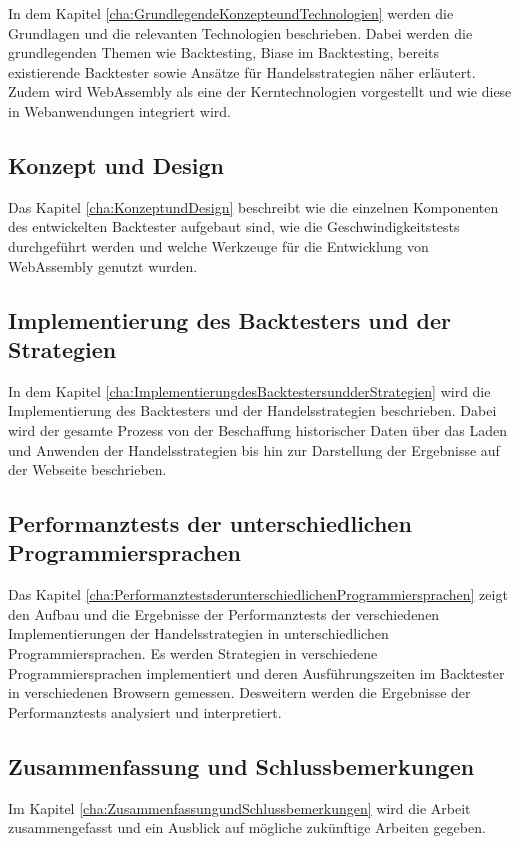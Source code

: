 In dem Kapitel \ref{cha:GrundlegendeKonzepteundTechnologien} werden die Grundlagen und die relevanten Technologien beschrieben.
Dabei werden die grundlegenden Themen wie Backtesting, Biase im Backtesting, bereits existierende Backtester sowie Ansätze für Handelsstrategien näher erläutert.
Zudem wird WebAssembly als eine der Kerntechnologien vorgestellt und wie diese in Webanwendungen integriert wird.

\subsection{Konzept und Design}
\label{subsec:KonzeptundDesign}

Das Kapitel \ref{cha:KonzeptundDesign} beschreibt wie die einzelnen Komponenten des entwickelten Backtester aufgebaut sind, wie die Geschwindigkeitstests durchgeführt werden und welche Werkzeuge für die Entwicklung von WebAssembly genutzt wurden. 

\subsection{Implementierung des Backtesters und der Strategien}
\label{subsec:ImplementierungdesBacktestersundderStrategien}

In dem Kapitel \ref{cha:ImplementierungdesBacktestersundderStrategien} wird die Implementierung des Backtesters und der Handelsstrategien beschrieben.
Dabei wird der gesamte Prozess von der Beschaffung historischer Daten über das Laden und Anwenden der Handelsstrategien bis hin zur Darstellung der Ergebnisse auf der Webseite beschrieben.

\subsection{Performanztests der unterschiedlichen Programmiersprachen}
\label{subsec:PerformanztestsderunterschiedlichenProgrammiersprachen}

Das Kapitel \ref{cha:PerformanztestsderunterschiedlichenProgrammiersprachen} zeigt den Aufbau und die Ergebnisse der Performanztests der verschiedenen Implementierungen der Handelsstrategien in unterschiedlichen Programmiersprachen.
Es werden Strategien in verschiedene Programmiersprachen implementiert und deren Ausführungszeiten im Backtester in verschiedenen Browsern gemessen.
Desweitern werden die Ergebnisse der Performanztests analysiert und interpretiert.

\subsection{Zusammenfassung und Schlussbemerkungen}
\label{subsec:Zusammenfassung und Schlussbemerkungen}

Im Kapitel \ref{cha:ZusammenfassungundSchlussbemerkungen} wird die Arbeit zusammengefasst und ein Ausblick auf mögliche zukünftige Arbeiten gegeben.
